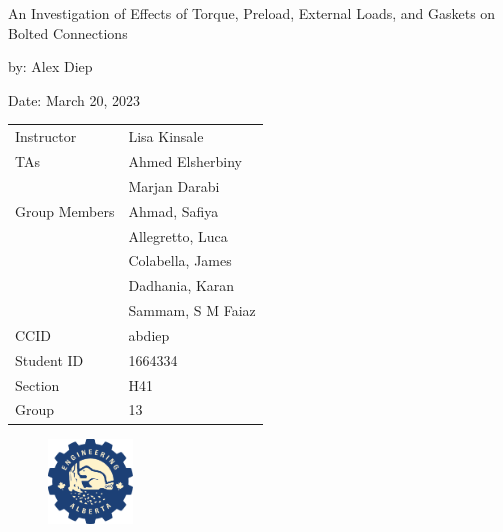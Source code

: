 \documentclass[letterpaper,12pt]{article} %
\begin{document}
\begin{titlepage}
    \centering
    \vspace*{2cm} %
    
    \Huge {An Investigation of Effects of Torque, Preload, External Loads, and Gaskets on Bolted Connections} \\
    \vspace{1cm} %
    
    \Large by: Alex Diep \\
    \vspace{1cm} %

    \Large Date: March 20, 2023 \\ %
    \vspace{2cm} %

    \begin{table}[h]
        \centering
        \begin{tabular}{ll}
            Instructor & Lisa Kinsale \\
            TAs & Ahmed Elsherbiny \\
            & Marjan Darabi \vspace{0.5cm} \\
            Group Members & Ahmad, Safiya \\
            & Allegretto, Luca \\
            & Colabella, James \\
            & Dadhania, Karan \\
            & Sammam, S M Faiaz \vspace{0.5cm} \\
            CCID & abdiep \\
            Student ID & 1664334 \\
            Section & H41 \\
            Group & 13 \\
        \end{tabular}
    \end{table}
    \begin{figure}[h]
        \centering
        \includegraphics[width=0.2\textwidth]{uofa_engineering_logo.png}
    \end{figure}
    \vfill %
\end{titlepage}
\renewcommand\arraystretch{1.5}
\end{document}
